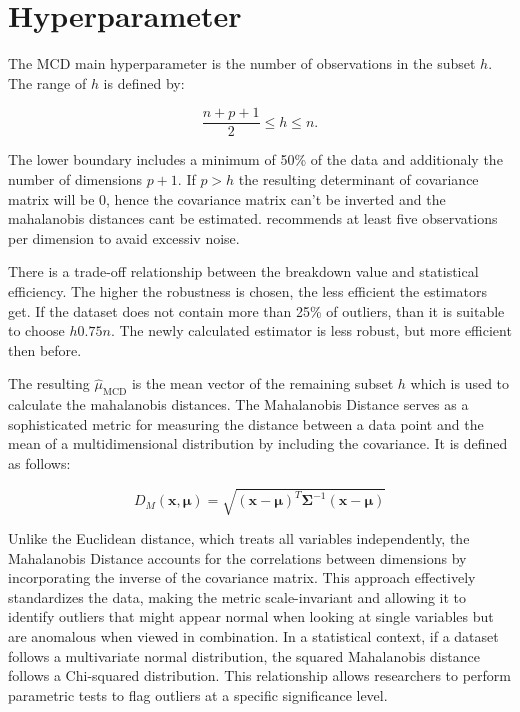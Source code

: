 \section*{Hyperparameter}
The MCD main hyperparameter is the number of observations in the subset $h$.
The range of $h$ is defined by: 


\begin{equation}
    \frac{n+p+1}{2} \le h \le n. 
\end{equation}


The lower boundary includes a minimum of 50\% of the data and additionaly the number of dimensions $p+1$.
If $p > h$ the resulting determinant of covariance matrix will be 0, hence the covariance matrix can't be inverted and the mahalanobis distances cant be estimated.
\citet{hubert2018minimum} recommends at least five observations per dimension to avaid excessiv noise. 

There is a trade-off relationship between the breakdown value and statistical efficiency.
The higher the robustness is chosen, the less efficient the estimators get. 
If the dataset does not contain more than 25\% of outliers, than it is suitable to choose $h  0.75n$. \citep[p.217]{rousseeuw1999fast}
The newly calculated estimator is less robust, but more efficient then before. 

The resulting $\hat{\mu}_{\text{MCD}}$ is the mean vector of the remaining subset $h$ which is used to calculate the mahalanobis distances.
The Mahalanobis Distance serves as a sophisticated metric for measuring the distance between a data point and the mean of a multidimensional distribution by including the covariance. 
It is defined as follows:


\begin{equation}
    D_M(\mathbf{x}, \mathbf{\mu}) = \sqrt{ (\mathbf{x} - \mathbf{\mu})^T \mathbf{\Sigma}^{-1} (\mathbf{x} - \mathbf{\mu}) }
    \label{eq:mahalanobis}
\end{equation}


Unlike the Euclidean distance, which treats all variables independently, the Mahalanobis Distance accounts for the correlations between dimensions by incorporating the inverse of the covariance matrix. 
This approach effectively standardizes the data, making the metric scale-invariant and allowing it to identify outliers that might appear normal when looking at single variables but are anomalous when viewed in combination.
In a statistical context, if a dataset follows a multivariate normal distribution, the squared Mahalanobis distance follows a Chi-squared distribution. 
This relationship allows researchers to perform parametric tests to flag outliers at a specific significance level. 


